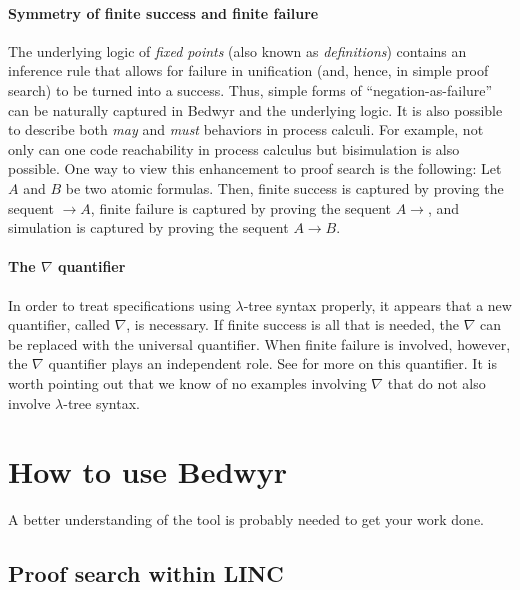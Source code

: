 \documentclass{article}
\begin{document}
\paragraph{Symmetry of finite success and finite failure}
The underlying logic of {\em fixed points} (also known as {\em
definitions})
\cite{girard92mail,schroeder-Heister93lics,mcdowell03tcs,momigliano03types}
contains an inference rule that allows for failure in unification
(and, hence, in simple proof search) to be turned into a success.
Thus, simple forms of ``negation-as-failure'' can be naturally
captured in Bedwyr and the underlying logic.  It is also possible to
describe both {\em may} and {\em must} behaviors in process calculi.
For example, not only can one code reachability in process calculus
but bisimulation is also possible.  One way to view this enhancement
to proof search is the following: Let $A$ and $B$ be two atomic
formulas.  Then, finite success is captured by proving the sequent
$\longrightarrow A$, finite failure is captured by proving the sequent
$A\longrightarrow$, and simulation is captured by proving the sequent
$A\longrightarrow B$.

\paragraph{The $\nabla$ quantifier}
In order to treat specifications using $\lambda$-tree syntax
properly, it appears that a new quantifier, called $\nabla$, is
necessary.  If finite success is all that is needed, the $\nabla$ can
be replaced with the universal quantifier.  When finite failure is
involved, however, the $\nabla$ quantifier plays an independent role.
See \cite{miller05tocl,tiu04phd,tiu05concur} for more on this
quantifier.  It is worth pointing out that we know of no examples
involving $\nabla$ that do not also involve $\lambda$-tree syntax.


\section{How to use Bedwyr}
\label{sec:howto}

A better understanding of the tool is probably needed to get your work
done.

\subsection{Proof search within LINC}
\label{psearch}
\end{document}

